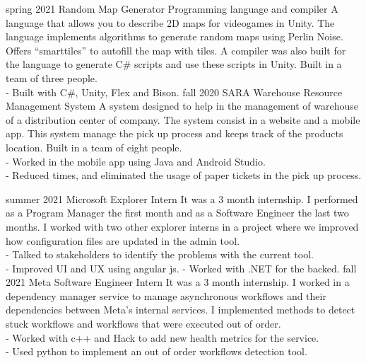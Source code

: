 \documentclass[9pt]{developercv} %
\begin{document}


\begin{entrylist}
	\entry
		{spring 2021}
		{Random Map Generator}
		{Programming language and compiler}
		{A language that allows you to describe 2D maps for videogames in Unity. The language implements algorithms to generate random maps using Perlin Noise. Offers ``smarttiles'' to autofill the map with tiles. A compiler was also built for the language to generate C\# scripts and use these scripts in Unity. Built in a team of three people.\\
		- Built with C\#, Unity, Flex and Bison.}
	\entry
		{fall 2020}
		{SARA}
		{Warehouse Resource Management System}
		{A system designed to help in the management of warehouse of a distribution center of company. The system consist in a website and a mobile app. This system manage the pick up process and keeps track of the products location. Built in a team of eight people.\\
		- Worked in the mobile app using Java and Android Studio.\\
		- Reduced times, and eliminated the usage of paper tickets in the pick up process.
		}
\end{entrylist}


\begin{entrylist}
	\entry
		{summer 2021}
		{Microsoft}
		{Explorer Intern}
		{It was a 3 month internship. I performed as a Program Manager the first month and as a Software Engineer the last two months. I worked with two other explorer interns in a project where we improved how configuration files are updated in the admin tool.\\
		- Talked to stakeholders to identify the problems with the current tool.\\
		- Improved UI and UX using angular js.
		- Worked with .NET for the backed.}
	\entry
		{fall 2021}
		{Meta}
		{Software Engineer Intern}
		{It was a 3 month internship. I worked in a dependency manager service to manage asynchronous workflows and their dependencies between Meta's internal services. I implemented methods to detect stuck workflows and workflows that were executed out of order.\\
		- Worked with c++ and Hack to add new health metrics for the service.\\
		- Used python to implement an out of order workflows detection tool.\\
		}
\end{entrylist}
\end{document}
